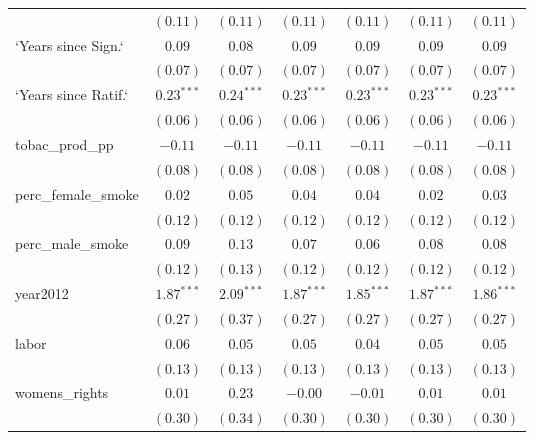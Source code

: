 \begin{table}[!h]
\begin{center}
\begin{tabular}{l c c c c c c }
                        & $(0.11)$     & $(0.11)$     & $(0.11)$     & $(0.11)$     & $(0.11)$     & $(0.11)$     \\
`Years since Sign.`     & $0.09$       & $0.08$       & $0.09$       & $0.09$       & $0.09$       & $0.09$       \\
                        & $(0.07)$     & $(0.07)$     & $(0.07)$     & $(0.07)$     & $(0.07)$     & $(0.07)$     \\
`Years since Ratif.`    & $0.23^{***}$ & $0.24^{***}$ & $0.23^{***}$ & $0.23^{***}$ & $0.23^{***}$ & $0.23^{***}$ \\
                        & $(0.06)$     & $(0.06)$     & $(0.06)$     & $(0.06)$     & $(0.06)$     & $(0.06)$     \\
tobac\_prod\_pp         & $-0.11$      & $-0.11$      & $-0.11$      & $-0.11$      & $-0.11$      & $-0.11$      \\
                        & $(0.08)$     & $(0.08)$     & $(0.08)$     & $(0.08)$     & $(0.08)$     & $(0.08)$     \\
perc\_female\_smoke     & $0.02$       & $0.05$       & $0.04$       & $0.04$       & $0.02$       & $0.03$       \\
                        & $(0.12)$     & $(0.12)$     & $(0.12)$     & $(0.12)$     & $(0.12)$     & $(0.12)$     \\
perc\_male\_smoke       & $0.09$       & $0.13$       & $0.07$       & $0.06$       & $0.08$       & $0.08$       \\
                        & $(0.12)$     & $(0.13)$     & $(0.12)$     & $(0.12)$     & $(0.12)$     & $(0.12)$     \\
year2012                & $1.87^{***}$ & $2.09^{***}$ & $1.87^{***}$ & $1.85^{***}$ & $1.87^{***}$ & $1.86^{***}$ \\
                        & $(0.27)$     & $(0.37)$     & $(0.27)$     & $(0.27)$     & $(0.27)$     & $(0.27)$     \\
labor                   & $0.06$       & $0.05$       & $0.05$       & $0.04$       & $0.05$       & $0.05$       \\
                        & $(0.13)$     & $(0.13)$     & $(0.13)$     & $(0.13)$     & $(0.13)$     & $(0.13)$     \\
womens\_rights          & $0.01$       & $0.23$       & $-0.00$      & $-0.01$      & $0.01$       & $0.01$       \\
                        & $(0.30)$     & $(0.34)$     & $(0.30)$     & $(0.30)$     & $(0.30)$     & $(0.30)$     \\

\end{tabular}
\end{center}
\end{table}
